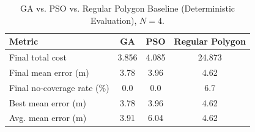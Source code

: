 \begin{table}[t]
\centering
\caption{GA vs. PSO vs. Regular Polygon Baseline (Deterministic Evaluation), $N=4$.}
\label{tab:ga_pso_polygon_n4}
\begin{tabular}{lccc}
\hline
Metric & GA & PSO & Regular Polygon \\
\hline
Final total cost & 3.856 & 4.085 & 24.873 \\
Final mean error (m) & 3.78 & 3.96 & 4.62 \\
Final no-coverage rate (\%) & 0.0 & 0.0 & 6.7 \\
Best mean error (m) & 3.78 & 3.96 & 4.62 \\
Avg. mean error (m) & 3.91 & 6.04 & 4.62 \\
\hline
\end{tabular}
\end{table}